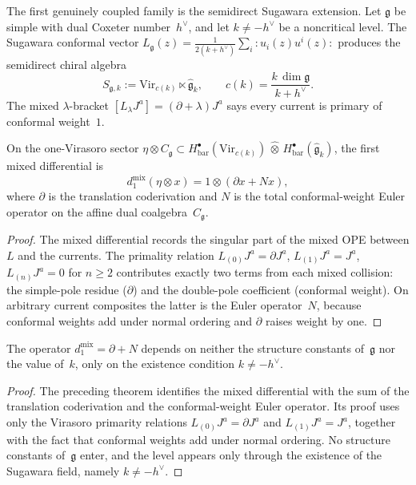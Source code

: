 The first genuinely coupled family is the semidirect Sugawara
extension. Let $\mathfrak{g}$ be simple with dual Coxeter
number~$h^\vee$, and let $k \neq -h^\vee$ be a noncritical level.
The Sugawara conformal vector
$L_\mathfrak{g}(z) = \tfrac{1}{2(k+h^\vee)}
\sum_i {:}u_i(z)u^i(z){:}$
produces the semidirect chiral algebra
\[
S_{\mathfrak{g},k}
:= \mathrm{Vir}_{c(k)} \ltimes \widehat{\mathfrak{g}}_k,
\qquad
c(k) = \frac{k\,\dim\mathfrak{g}}{k + h^\vee}.
\]
The mixed $\lambda$-bracket
$[L_\lambda J^a] = (\partial + \lambda)J^a$
says every current is primary of conformal weight~$1$.

\begin{theorem}
\label{thm:universal-sugawara-d1}
On the one-Virasoro sector
$\eta \otimes C_\mathfrak{g}
\subset H^\bullet_{\mathrm{bar}}(\mathrm{Vir}_{c(k)})
\,\widehat{\otimes}\,
H^\bullet_{\mathrm{bar}}(\widehat{\mathfrak{g}}_k)$,
the first mixed differential is
\begin{equation}\label{eq:universal-d1-sugawara}
d_1^{\mathrm{mix}}(\eta \otimes x)
= 1 \otimes (\partial x + Nx),
\end{equation}
where $\partial$ is the translation coderivation and $N$ is the
total conformal-weight Euler operator on the affine dual
coalgebra~$C_\mathfrak{g}$.
\end{theorem}

\begin{proof}
The mixed differential records the singular part of the mixed OPE
between $L$ and the currents. The primality relation
$L_{(0)} J^a = \partial J^a$, $L_{(1)} J^a = J^a$,
$L_{(n)} J^a = 0$ for $n \geq 2$
contributes exactly two terms from each mixed collision: the
simple-pole residue ($\partial$) and the double-pole coefficient
(conformal weight). On arbitrary current composites the latter is
the Euler operator~$N$, because conformal weights add under normal
ordering and $\partial$ raises weight by one.
\end{proof}

\begin{corollary}
\label{cor:sugawara-universality}
The operator $d_1^{\mathrm{mix}} = \partial + N$ depends on neither
the structure constants of~$\mathfrak{g}$ nor the value of~$k$,
only on the existence condition $k \neq -h^\vee$.
\end{corollary}

\begin{proof}
The preceding theorem identifies the mixed differential with the sum
of the translation coderivation and the conformal-weight Euler
operator. Its proof uses only the Virasoro primarity relations
$L_{(0)}J^a=\partial J^a$ and $L_{(1)}J^a=J^a$, together with the
fact that conformal weights add under normal ordering. No structure
constants of~$\mathfrak{g}$ enter, and the level appears only through
the existence of the Sugawara field, namely $k \neq -h^\vee$.
\end{proof}


